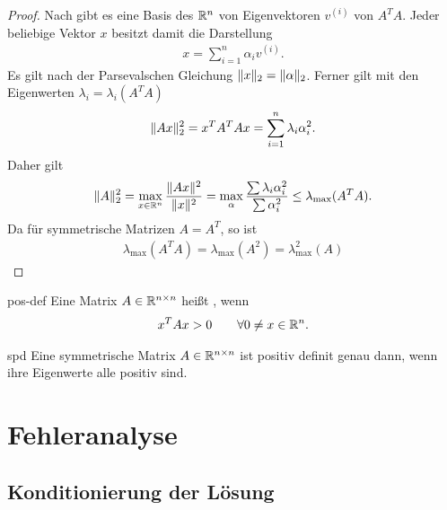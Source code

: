\begin{proof}
  Nach  gibt es eine Basis des $\mathbb R^n$ von
  Eigenvektoren $v^{(i)}$ von $A^TA$. Jeder beliebige Vektor $x$
  besitzt damit die Darstellung
  \begin{gather}
    x = \sum_{i=1}^n \alpha_i v^{(i)}.
  \end{gather}
  Es gilt nach der Parsevalschen Gleichung
  $\lVert x\rVert_2 = \lVert\alpha\rVert_2$. Ferner gilt mit den Eigenwerten
  $\lambda_i = \lambda_i(A^TA)$
  \begin{gather}
    \lVert Ax\rVert_2^2 = x^TA^TAx = \sum_{i=1}^n \lambda_i \alpha_i^2.
  \end{gather}
  Daher gilt
  \begin{gather}
    \lVert A\rVert_2^2 = \max_{x\in \mathbb R^n} \frac{\lVert Ax\rVert^2}{\lVert x\rVert^2}
    = \max_{\alpha} \frac{\sum \lambda_i\alpha_i^2}{\sum\alpha_i^2}
    \le \lambda_{\max}(A^TA).
  \end{gather}
  Da für symmetrische Matrizen $A=A^T$, so ist
  \begin{gather}
    \lambda_{\max}(A^TA) = \lambda_{\max}(A^2) = \lambda_{\max}^2(A)
  \end{gather}
\end{proof}

\begin{Definition}{pos-def}
  Eine Matrix $A\in\mathbb R^{n\times n}$ heißt , wenn
  \begin{gather}
    x^TAx > 0 \qquad\forall 0\neq x\in \mathbb R^n.
  \end{gather}
\end{Definition}

\begin{Satz}{spd}
  Eine symmetrische Matrix $A\in\mathbb R^{n\times n}$ ist positiv definit genau dann, wenn ihre Eigenwerte alle positiv sind.
\end{Satz}

\section{Fehleranalyse}

\subsection{Konditionierung der Lösung}

